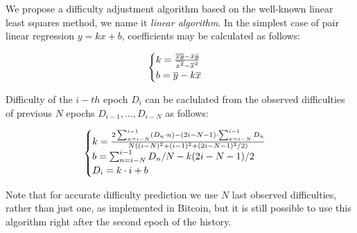\documentclass[]{llncs}
\newcommand*\mean[1]{\bar{#1}}
\newcommand*\widemean[1]{\overline{#1}}
\begin{document}

We propose a difficulty adjustment algorithm based on the well-known linear least squares method\cite{lawson1974solving}, we name it {\em linear algorithm}. In the simplest case of pair linear regression $y=kx+b$, coefficients may be calculated as follows:

\begin{equation}
  \begin{cases}
    k= {{\widemean{xy} - \mean{x} \mean{y}} \over {\widemean{x^2} - \widemean{x}^2}}  \\
    b= \widemean{y}-k\widemean{x}
  \end{cases}
\end{equation}

Difficulty of the $i-th$ epoch $D_i$ can be caclulated from the observed difficulties of previous $N$ epochs $D_{i-1},...,D_{i-N}$ as follows:

\begin{equation}
  \begin{cases}
    k= {2\sum_{n=i-N}^{i-1} (D_n \cdot n) - (2i-N-1)\cdot \sum_{n=i-N}^{i-1} D_n \over N ( (i-N)^2 + (i-1)^2 + (2i-N-1)^2/2 )} \\
    b= \sum_{n=i-N}^{i-1} D_n / N-k (2i-N-1)/2 \\
    D_i= k \cdot i + b
  \end{cases}
\end{equation}

Note that for accurate difficulty prediction we use $N$ last observed difficulties, rather than just one, as implemented in Bitcoin, but it is still possible to use this algorithm right after the second epoch of the history.


\end{document}
